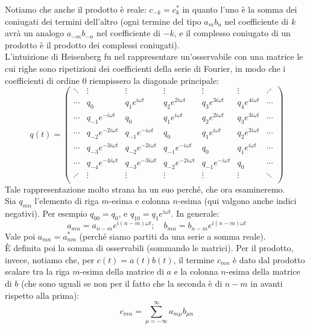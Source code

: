 \documentclass[FisicaTeorica.tex]{subfiles}
\begin{document}
Notiamo che anche il prodotto è reale: $c_{-k} = c_k^*$ in quanto l'uno è la somma dei coniugati dei termini dell'altro (ogni termine del tipo $a_m b_n$ nel coefficiente di $k$ avrà un analogo $a_{-m}b_{-n}$ nel coefficiente di $-k$, e il complesso coniugato di un prodotto è il prodotto dei complessi coniugati).\\
L'intuizione di Heisenberg fu nel rappresentare un'osservabile con una matrice le cui righe sono ripetizioni  dei coefficienti della serie di Fourier, in modo che i coefficienti di ordine $0$ riempissero la diagonale principale:
\[
q(t) = \begin{pmatrix}
\ddots & \vdots & \vdots & \vdots & \vdots & \vdots & \iddots\\
\cdots & q_0 & q_1 e^{i\omega t} & q_2 e^{2i\omega t} & q_3 e^{3i\omega t} & q_4 e^{4i\omega t}  & \cdots\\
\cdots & q_{-1}e^{-i\omega t} &  q_0 & q_1 e^{i\omega t} & q_2 e^{2i\omega t} & q_3 e^{3i\omega t}  & \cdots\\
\cdots & q_{-2}e^{-2i\omega t} & q_{-1}e^{-i\omega t} &  q_0 & q_1 e^{i\omega t} & q_2 e^{2i\omega t} & \cdots\\
\cdots & q_{-3}e^{-3i\omega t} & q_{-2}e^{-2i\omega t} & q_{-1}e^{-i\omega t} &  q_0 & q_1 e^{i\omega t}  & \cdots\\
\cdots & q_{-4}e^{-4i\omega t} & q_{-3}e^{-3i\omega t} & q_{-2}e^{-2i\omega t} & q_{-1}e^{-i\omega t} &  q_0 & \cdots\\
\iddots & \vdots & \vdots & \vdots & \vdots & \vdots & \ddots\\
\end{pmatrix}
\]
Tale rappresentazione molto strana ha un suo perché, che ora esamineremo.\\
Sia $q_{mn}$ l'elemento di riga $m$-esima e colonna $n$-esima (qui valgono anche indici negativi). Per esempio $q_{00} = q_0$, e $q_{10} = q_1 e^{i\omega t}$. In generale:
\[
a_{mn} = a_{n-m}e^{i(n-m)\omega t}; \quad b_{mn} = b_{n-m}e^{i(n-m)\omega t}
\]
Vale poi $a_{mn} = a^*_{nm}$ (perché siamo partiti da una serie a somma reale).\\
È definita poi la somma di osservabili (sommando le matrici). Per il prodotto, invece, notiamo che, per $c(t) = a(t) b(t)$, il termine $c_{mn}$ è dato dal prodotto scalare tra la riga $m$-esima della matrice di $a$ e la colonna $n$-esima della matrice di $b$ (che sono uguali se non per il fatto che la seconda è  di $n-m$ in avanti rispetto alla prima):
\[
c_{mn} = \sum_{\mu=-\infty}^\infty a_{m\mu} b_{\mu n}
\]
\end{document}
